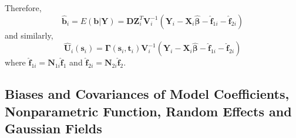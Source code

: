 \documentclass[12pt, notitlepage]{article}
\begin{document}
Therefore,
\begin{equation}\label{bHat}
\boldsymbol {\hat b}_i = E(\boldsymbol b | \boldsymbol Y)
=  \boldsymbol D \boldsymbol Z_i^T   \boldsymbol V_i^{-1} 
(\boldsymbol Y_i - \boldsymbol X_i\boldsymbol{\hat \beta} -
 \boldsymbol {\hat f}_{1i} -
\boldsymbol {\hat f}_{2i})
\end{equation}
and similarly,   
\begin{equation}\label{uHat}
\bm {\hat U}_i(\bm s_i)
=
\bm \Gamma(\bm s_i, \bm t_i) \bm V_i^{-1}
(\boldsymbol Y_i - \boldsymbol X_i\boldsymbol{\hat \beta} -
 \boldsymbol {\hat f}_{1i} -
\boldsymbol {\hat f}_{2i})
\end{equation}
where $\boldsymbol {\hat f}_{1i} =  \boldsymbol N_{1i} \boldsymbol {\hat f}_1$
and 
$\boldsymbol {\hat f}_{2i} =  \boldsymbol N_{2i} \boldsymbol {\hat f}_2$. 



\subsection{Biases and Covariances of Model Coefficients, Nonparametric Function, Random Effects and Gaussian Fields} \label{biasCov}
\end{document}
